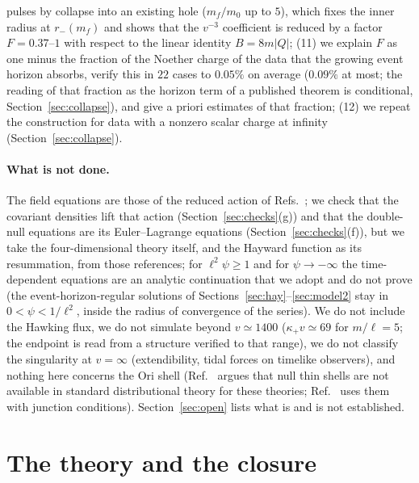 \documentclass[11pt]{article}
\begin{document}
pulses by collapse into an existing hole ($m_f/m_0$ up to $5$), which fixes the inner radius at $r_-(m_f)$ and shows that the $v^{-3}$ coefficient is reduced by a factor $F=0.37$--$1$ with respect to the linear identity $B=8m|Q|$; (11) we explain $F$ as one minus the fraction of the Noether charge of the data that the growing event horizon absorbs, verify this in $22$ cases to $0.05\%$ on average ($0.09\%$ at most; the reading of that fraction as the horizon term of a published theorem is conditional, Section~\ref{sec:collapse}), and give a priori estimates of that fraction; (12) we repeat the construction for data with a nonzero scalar charge at infinity (Section~\ref{sec:collapse}).

\paragraph{What is not done.} The field equations are those of the reduced action of Refs.~\cite{BuenoCanoHennigarMurcia2025,BorissovaCarballoRubio2026}; we check that the covariant densities lift that action (Section~\ref{sec:checks}(g)) and that the double-null equations are its Euler--Lagrange equations (Section~\ref{sec:checks}(f)), but we take the four-dimensional theory itself, and the Hayward function as its resummation, from those references; for $\ell^{2}\psi\ge1$ and for $\psi\to-\infty$ the time-dependent equations are an analytic continuation that we adopt and do not prove (the event-horizon-regular solutions of Sections~\ref{sec:hay}--\ref{sec:model2} stay in $0<\psi<1/\ell^{2}$, inside the radius of convergence of the series). We do not include the Hawking flux, we do not simulate beyond $v\simeq1400$ ($\kappa_+v\simeq69$ for $m/\ell=5$; the endpoint is read from a structure verified to that range), we do not classify the singularity at $v=\infty$ (extendibility, tidal forces on timelike observers), and nothing here concerns the Ori shell (Ref.~\cite{DiFilippo2026} argues that null thin shells are not available in standard distributional theory for these theories; Ref.~\cite{FrolovZelnikov2026} uses them with junction conditions). Section~\ref{sec:open} lists what is and is not established.

\section{The theory and the closure}
\label{sec:theory}
\end{document}
